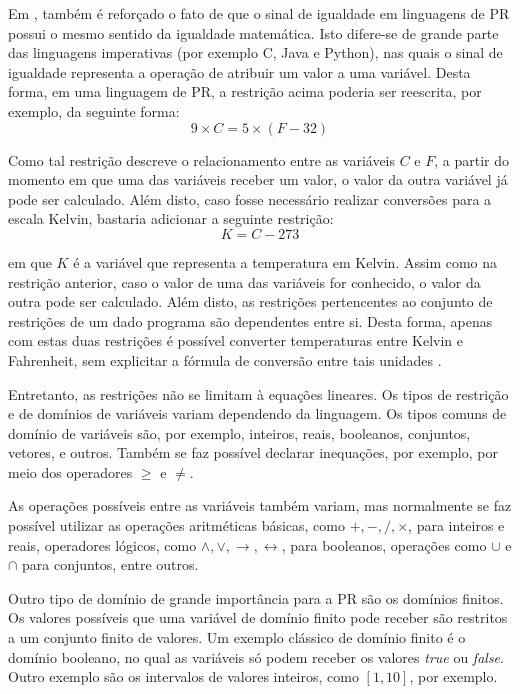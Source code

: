 Em \cite{leler}, também é reforçado o fato de que o sinal de igualdade em linguagens de PR possui o mesmo sentido da igualdade matemática. Isto difere-se de grande parte das linguagens imperativas (por exemplo C, Java e Python), nas quais o sinal de igualdade representa a operação de atribuir um valor a uma variável. Desta forma, em uma linguagem de PR, a restrição acima poderia ser reescrita, por exemplo, da seguinte forma:
\[
  9 \times C = 5 \times (F - 32)
\]

Como tal restrição descreve o relacionamento entre as variáveis $C$ e $F$, a partir do momento em que uma das variáveis receber um valor, o valor da outra variável já pode ser calculado. Além disto, caso fosse necessário realizar conversões para a escala Kelvin, bastaria adicionar a seguinte restrição:
\[
  K = C - 273
\]

em que $K$ é a variável que representa a temperatura em Kelvin. Assim como na restrição anterior, caso o valor de uma das variáveis for conhecido, o valor da outra pode ser calculado. Além disto, as restrições pertencentes ao conjunto de restrições de um dado programa são dependentes entre si. Desta forma, apenas com estas duas restrições é possível converter temperaturas entre Kelvin e Fahrenheit, sem explicitar a fórmula de conversão entre tais unidades \cite{leler}.

Entretanto, as restrições não se limitam à equações lineares. Os tipos de restrição e de domínios de variáveis variam dependendo da linguagem. Os tipos comuns de domínio de variáveis são, por exemplo, inteiros, reais, booleanos, conjuntos, vetores, e outros. Também se faz possível declarar inequações, por exemplo, por meio dos operadores $\ge$ e $\not=$.

As operações possíveis entre as variáveis também variam, mas normalmente se faz possível utilizar as operações aritméticas básicas, como $+, -, /, \times$, para inteiros e reais, operadores lógicos, como $\wedge, \vee, \rightarrow, \leftrightarrow$, para booleanos, operações como $\cup$ e $\cap$ para conjuntos, entre outros.

Outro tipo de domínio de grande importância para a PR são os domínios finitos. Os valores possíveis que uma variável de domínio finito pode receber são restritos a um conjunto finito de valores. Um exemplo clássico de domínio finito é o domínio booleano, no qual as variáveis só podem receber os valores \textit{true} ou \textit{false}. Outro exemplo são os intervalos de valores inteiros, como $[1,10]$, por exemplo.

